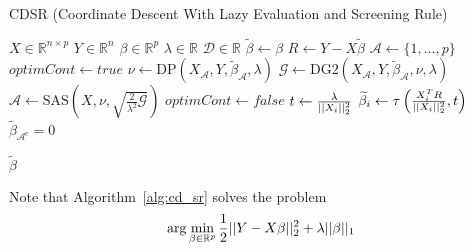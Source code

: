 \documentclass[letterpaper,11pt]{article}
\begin{document}
\FloatBarrier
\begin{algorithm}[!htbp]
  \caption{CDSR (Coordinate Descent With Lazy Evaluation and Screening Rule) \label{alg:cd_sr}}
  \begin{algorithmic}[1]
  \Statex
  \Input{} 
  \Statex $X \in \mathbb{R}^{n \times p} $ 
  \Statex $Y \in \mathbb{R}^n$  
  \Statex $\beta \in \mathbb{R}^p$  
  \Statex $\lambda \in \mathbb{R}$  
  \Statex $\mathcal{D} \in \mathbb{R}$  
    \State $\widetilde{\beta} \gets \beta$ 
    \State $R \gets Y - X \widetilde{\beta}$ 
    \State $\mathcal{A} \gets \{1,\ldots,p\}$ 
    \State $optimCont \gets true$ 
      \State $\nu \gets \text{DP}(X_{\mathcal{A}},Y, \widetilde{\beta}_{\mathcal{A}}, \lambda)$ 
      \State $\mathcal{G} \gets \text{DG2}(X_{\mathcal{A}},Y, \widetilde{\beta}_{\mathcal{A}}, \nu, \lambda)$  
      \State $\mathcal{A} \gets \text{SAS}(X, \nu, \sqrt{\frac{2}{\lambda^2}\mathcal{G}})$ 
      	\State $optimCont \gets false$
      \Else
          \State $t \gets \frac{ \lambda }{ \lvert \lvert  X_i  \rvert \rvert_2^2 }$ 
          \EndIf
          \State $\widetilde{\beta}_i \gets \tau \left( \frac{X_i^T R}{ \lvert \lvert  X_i  \rvert \rvert_2^2 }, t \right)$ 
          \EndIf  
        \EndFor
        \EndIf
        \State $\widetilde{\beta}_{\mathcal{A}^c}=0$ 
      \EndWhile
  \end{algorithmic}
  \Return $\widetilde{\beta}$
\end{algorithm}
\FloatBarrier

Note that Algorithm~\ref{alg:cd_sr} solves the problem
\begin{equation}\label{eq:lasso_half}
\arg\min_{\beta\in\mathbb{R}^p}\frac{1}{2}\lvert \lvert Y-X\beta \rvert \rvert_2^2 + \lambda\lvert \lvert \beta \rvert \rvert_1
\end{equation}
\end{document}

